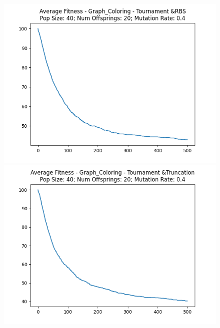 \documentclass[12pt]{report}
\theoremstyle{mytheoremstyle}
\theoremstyle{mytheoremstyle}
\theoremstyle{myproblemstyle}
\begin{document}
\begin{figure}[!]
\begin{minipage}{0.4\textwidth}
		\includegraphics[width=\linewidth]{../Analysis/ASF_Graph_Coloring_2_1_40_20.png}
	\end{minipage}
	\hspace{\fill}
	\begin{minipage}{0.4\textwidth}
		\includegraphics[width=\linewidth]{../Analysis/ASF_Graph_Coloring_2_3_40_20.png}
	\end{minipage}
	\vspace*{1cm}
	\begin{minipage}{0.4\textwidth}

\end{minipage}
\end{figure}
\end{document}
